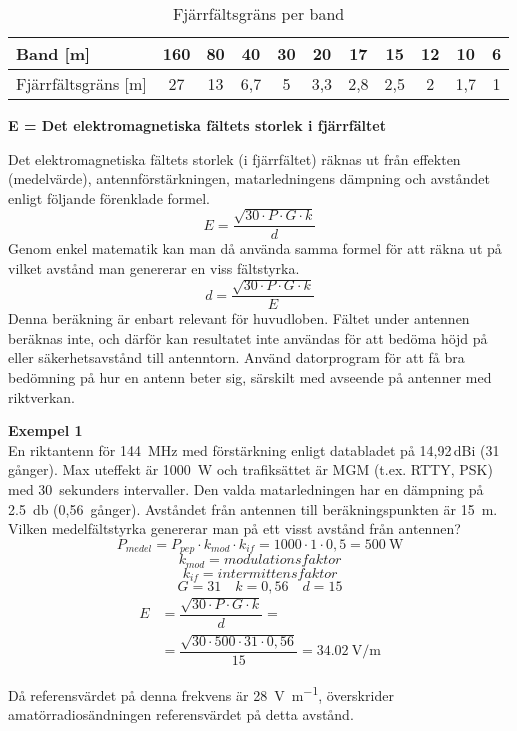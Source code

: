 \begin{table*}[ht]
  \begin{center}
    \begin{tabular}{|l|c|c|c|c|c|c|c|c|c|c|}
	\hline
	Band [m] & 160 & 80 & 40 & 30 & 20 & 17 & 15 & 12 & 10 & 6 \\ \hline
	Fjärrfältsgräns [m] & 27 & 13 & 6,7 & 5 & 3,3 & 2,8 & 2,5 & 2 & 1,7 & 1 \\ \hline
    \end{tabular}
    \caption{Fjärrfältsgräns per band}
    \label{tab:fjfltgr}
  \end{center}
\end{table*}

\noindent\textbf{E = Det elektromagnetiska fältets storlek i fjärrfältet}

Det elektromagnetiska fältets storlek (i fjärrfältet) räknas ut från
effekten (medelvärde), antennförstärkningen, matarledningens dämpning
och avståndet enligt följande förenklade formel.
\[E=\dfrac{\sqrt{30 \cdot P \cdot G \cdot k}}{d}\]
Genom enkel matematik kan man då använda samma formel för att räkna
ut på vilket avstånd man genererar en viss fältstyrka.
\[d=\dfrac{\sqrt{30 \cdot P \cdot G \cdot k}}{E}\]
Denna beräkning är enbart relevant för huvudloben.
Fältet under antennen beräknas inte, och därför kan resultatet inte användas
för att bedöma höjd på eller säkerhetsavstånd till antenntorn.
Använd datorprogram för att få bra bedömning på hur en antenn beter sig,
särskilt med avseende på antenner med riktverkan.

\begin{exempelbox}
\textbf{Exempel 1} \\
En riktantenn för \qty{144}{\mega\hertz} med förstärkning enligt databladet på
14,92\,dBi (31 gånger).
Max uteffekt är \qty{1000}{\watt} och trafiksättet är MGM (t.ex. RTTY, PSK) med
30~sekunders intervaller.
Den valda matarledningen har en dämpning på \qty{2,5}{\decibel} (0,56~gånger).
Avståndet från antennen till beräkningspunkten är \qty{15}{\metre}.
Vilken medelfältstyrka genererar man på ett visst avstånd från antennen?
\tcblower
\noindent
\[P_{medel} = P_{pep} \cdot k_{mod} \cdot k_{if}
= 1000 \cdot 1 \cdot 0,5 = \qty{500}{\watt}\]
\[k_{mod} = modulationsfaktor\]
\[k_{if} = intermittensfaktor\]
\[G = 31 \quad k = 0,56 \quad d = 15\]
\begin{align*}
  E &= \dfrac{\sqrt{30 \cdot P \cdot G \cdot k}}{d} =\\
&= \dfrac{\sqrt{30 \cdot 500 \cdot 31 \cdot 0,56}}{15}
= \qty{34,02}{\volt\per\metre}
\end{align*}

Då referensvärdet på denna frekvens är \qty{28}{\volt\per\metre}, överskrider
amatörradiosändningen referensvärdet på detta avstånd.
\end{exempelbox}

